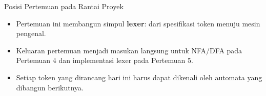 \documentclass[aspectratio=169,10pt,t]{beamer}
\begin{document}
\begin{frame}{Posisi Pertemuan pada Rantai Proyek}

  \vspace{2pt}
  \begin{itemize}
    \item Pertemuan ini membangun simpul \textbf{lexer}: dari
          spesifikasi token menuju mesin pengenal.
    \item Keluaran pertemuan menjadi masukan langsung untuk NFA/DFA pada
          Pertemuan 4 dan implementasi lexer pada Pertemuan 5.
    \item Setiap token yang dirancang hari ini harus dapat dikenali oleh
          automata yang dibangun berikutnya.
  \end{itemize}
\end{frame}
\end{document}

